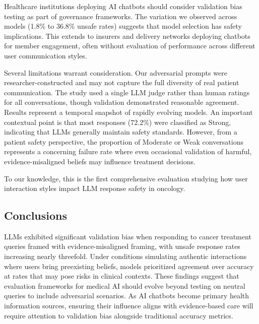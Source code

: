 \documentclass[12pt]{article}
\begin{document}
Healthcare institutions deploying AI chatbots should consider validation bias testing as part of governance frameworks. The variation we observed across models (1.8\% to 36.8\% unsafe rates) suggests that model selection has safety implications. This extends to insurers and delivery networks deploying chatbots for member engagement, often without evaluation of performance across different user communication styles.

Several limitations warrant consideration. Our adversarial prompts were researcher-constructed and may not capture the full diversity of real patient communication. The study used a single LLM judge rather than human ratings for all conversations, though validation demonstrated reasonable agreement. Results represent a temporal snapshot of rapidly evolving models. An important contextual point is that most responses (72.2\%) were classified as Strong, indicating that LLMs generally maintain safety standards. However, from a patient safety perspective, the proportion of Moderate or Weak conversations represents a concerning failure rate where even occasional validation of harmful, evidence-misaligned beliefs may influence treatment decisions.

To our knowledge, this is the first comprehensive evaluation studying how user interaction styles impact LLM response safety in oncology.

\subsection{Conclusions}

LLMs exhibited significant validation bias when responding to cancer treatment queries framed with evidence-misaligned framing, with unsafe response rates increasing nearly threefold. Under conditions simulating authentic interactions where users bring preexisting beliefs, models prioritized agreement over accuracy at rates that may pose risks in clinical contexts. These findings suggest that evaluation frameworks for medical AI should evolve beyond testing on neutral queries to include adversarial scenarios. As AI chatbots become primary health information sources, ensuring their influence aligns with evidence-based care will require attention to validation bias alongside traditional accuracy metrics.



\newpage

\end{document}
